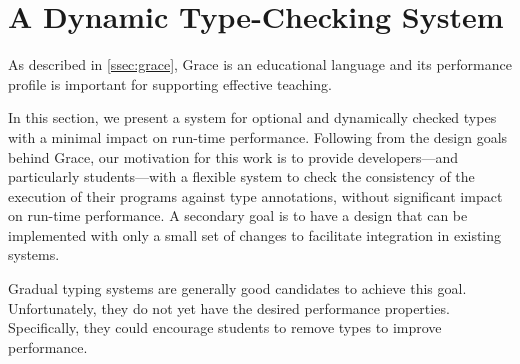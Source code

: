 
\section{A Dynamic Type-Checking System}
\label{sec:method}




As described in \cref{ssec:grace},
Grace is an educational language and its performance profile
is important for supporting effective teaching. 

In this section,
we present a system for optional and dynamically checked types
with a minimal impact on run-time performance.
Following from the design goals behind Grace,
our motivation for this work
is to provide developers---and particularly students---with a flexible system 
to check the consistency of the execution of their programs
against type annotations,
without significant impact on run-time performance.
A secondary goal is to have a design that can be implemented with
only a small set of changes to facilitate integration in existing systems.

Gradual typing systems are generally good candidates to achieve this goal.
Unfortunately, they do not yet have the desired performance properties\citep{Takikawa2016,Vitousek2017,Muehlboeck2017,Bauman2017,Richards2017,Greenman2018}.
Specifically, they could encourage students to remove types
to improve performance.





